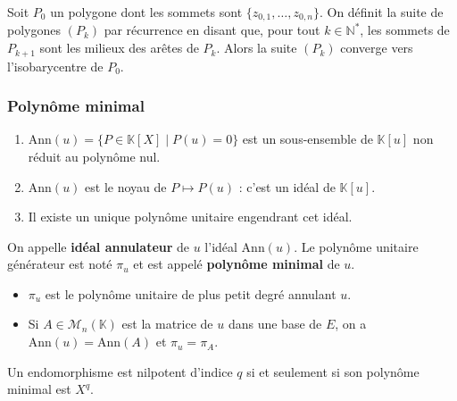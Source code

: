   \begin{application}
    Soit $P_0$ un polygone dont les sommets sont $\{ z_{0,1}, \dots, z_{0,n} \}$. On définit la suite de polygones $(P_k)$ par récurrence en disant que, pour tout $k \in \mathbb{N}^*$, les sommets de $P_{k+1}$ sont les milieux des arêtes de $P_k$.
    \newpar
    Alors la suite $(P_k)$ converge vers l'isobarycentre de $P_0$.
  \end{application}

  \subsubsection{Polynôme minimal}


  \begin{lemma}
    \begin{enumerate}[label=(\roman*)]
      \item $\mathrm{Ann}(u) = \{ P \in \mathbb{K}[X] \mid P(u) = 0 \}$ est un sous-ensemble de $\mathbb{K}[u]$ non réduit au polynôme nul.
      \item $\mathrm{Ann}(u)$ est le noyau de $P \mapsto P(u)$ : c'est un idéal de $\mathbb{K}[u]$.
      \item Il existe un unique polynôme unitaire engendrant cet idéal.
    \end{enumerate}
  \end{lemma}

  \begin{definition}
    On appelle \textbf{idéal annulateur} de $u$ l'idéal $\mathrm{Ann}(u)$. Le polynôme unitaire générateur est noté $\pi_u$ et est appelé \textbf{polynôme minimal} de $u$.
  \end{definition}

  \begin{remark}
    \begin{itemize}
      \item $\pi_u$ est le polynôme unitaire de plus petit degré annulant $u$.
      \item Si $A \in \mathcal{M}_n(\mathbb{K})$ est la matrice de $u$ dans une base de $E$, on a $\mathrm{Ann}(u) = \mathrm{Ann}(A)$ et $\pi_u = \pi_A$.
    \end{itemize}
  \end{remark}

  \begin{example}
    Un endomorphisme est nilpotent d'indice $q$ si et seulement si son polynôme minimal est $X^q$.
  \end{example}


